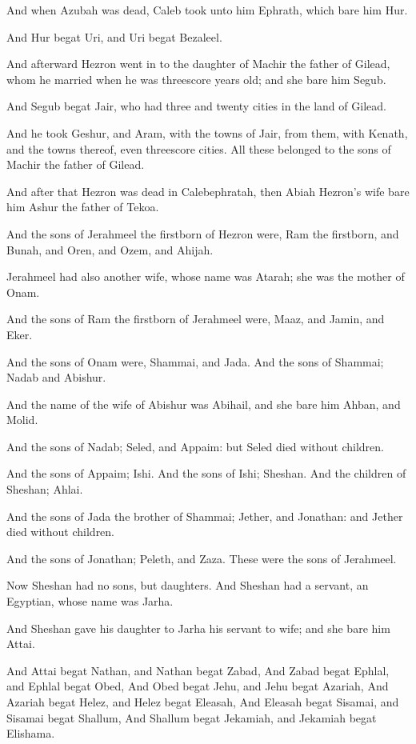 \verse And when Azubah was dead, Caleb took unto him Ephrath, which bare him Hur.

\verse And Hur begat Uri, and Uri begat Bezaleel.

\verse And afterward Hezron went in to the daughter of Machir the father of Gilead, whom he married when he was threescore years old; and she bare him Segub.

\verse And Segub begat Jair, who had three and twenty cities in the land of Gilead.

\verse And he took Geshur, and Aram, with the towns of Jair, from them, with Kenath, and the towns thereof, even threescore cities. All these belonged to the sons of Machir the father of Gilead.

\verse And after that Hezron was dead in Calebephratah, then Abiah Hezron's wife bare him Ashur the father of Tekoa.

\verse And the sons of Jerahmeel the firstborn of Hezron were, Ram the firstborn, and Bunah, and Oren, and Ozem, and Ahijah.

\verse Jerahmeel had also another wife, whose name was Atarah; she was the mother of Onam.

\verse And the sons of Ram the firstborn of Jerahmeel were, Maaz, and Jamin, and Eker.

\verse And the sons of Onam were, Shammai, and Jada. And the sons of Shammai; Nadab and Abishur.

\verse And the name of the wife of Abishur was Abihail, and she bare him Ahban, and Molid.

\verse And the sons of Nadab; Seled, and Appaim: but Seled died without children.

\verse And the sons of Appaim; Ishi. And the sons of Ishi; Sheshan. And the children of Sheshan; Ahlai.

\verse And the sons of Jada the brother of Shammai; Jether, and Jonathan: and Jether died without children.

\verse And the sons of Jonathan; Peleth, and Zaza. These were the sons of Jerahmeel.

\verse Now Sheshan had no sons, but daughters. And Sheshan had a servant, an Egyptian, whose name was Jarha.

\verse And Sheshan gave his daughter to Jarha his servant to wife; and she bare him Attai.

\verse And Attai begat Nathan, and Nathan begat Zabad, \verse And Zabad begat Ephlal, and Ephlal begat Obed, \verse And Obed begat Jehu, and Jehu begat Azariah, \verse And Azariah begat Helez, and Helez begat Eleasah, \verse And Eleasah begat Sisamai, and Sisamai begat Shallum, \verse And Shallum begat Jekamiah, and Jekamiah begat Elishama.

